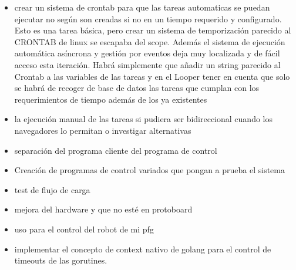 \begin{itemize}
    \item crear un sistema de crontab para que las tareas automaticas se puedan ejecutar no según son creadas si no en un tiempo requerido y configurado. Esto es una tarea básica, pero crear un sistema de temporización parecido al CRONTAB de linux se escapaba del scope. Además el sistema de ejecución automática asíncrona y gestión por eventos deja muy localizada y de fácil acceso esta iteración. Habrá simplemente que añadir un string parecido al Crontab a las variables de las tareas y en el Looper tener en cuenta que solo se habrá de recoger de base de datos las tareas que cumplan con los requerimientos de tiempo además de los ya existentes
    \item la ejecución manual de las tareas si pudiera ser bidireccional cuando los navegadores lo permitan o investigar alternativas
    \item separación del programa cliente del programa de control
    \item Creación de programas de control variados que pongan a prueba el sistema
    \item test de flujo de carga
    \item mejora del hardware y que no esté en protoboard
    \item uso para el control del robot de mi pfg
    \item implementar el concepto de context nativo de golang para el control de timeouts de las gorutines.
\end{itemize}
